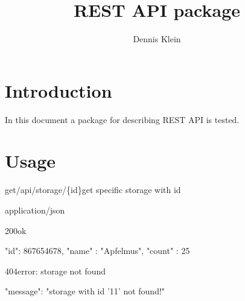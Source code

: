 \documentclass[12pt,a4paper]{article}
\title{REST API package}
\author{Dennis Klein}
\begin{document}
\maketitle

\section{Introduction}
In this document a package for describing REST API is tested. 







\section{Usage}


\begin{apiRoute}{get}{/api/storage/\{id\}}{get specific storage with id}
	
	\begin{routeParameter}
	\end{routeParameter}
	\begin{routeResponse}{application/json}
		\begin{routeResponseItem}{200}{ok}
			\begin{routeResponseItemBody}
{     
	"id": 867654678,
	"name" : "Apfelmus",
	"count" : 25
}
			\end{routeResponseItemBody}
		\end{routeResponseItem}
		\begin{routeResponseItem}{404}{error: storage not found}
			\begin{routeResponseItemBody}
{
	"message": "storage with id '11' not found!"
}
			\end{routeResponseItemBody}
		\end{routeResponseItem}
	\end{routeResponse}
	
\end{apiRoute}
\end{document}
